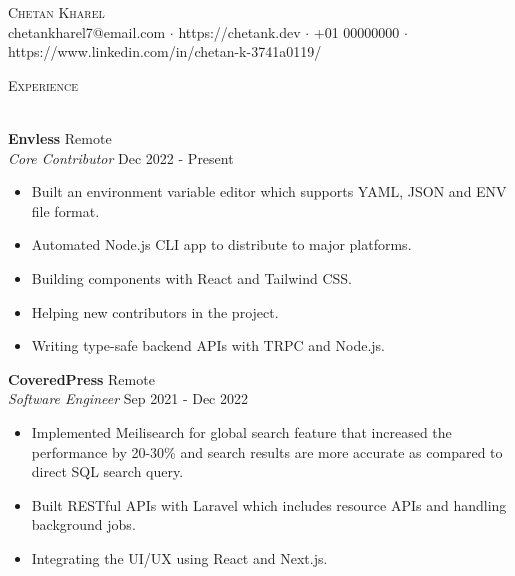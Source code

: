 \documentclass[a4paper]{article}
\newcommand{\lineunder} {
    \vspace*{-8pt} \\
    \hspace*{-18pt} \hrulefill \\
}
\newcommand{\header} [1] {
    {\hspace*{-18pt}\vspace*{6pt} \textsc{#1}}
    \vspace*{-6pt} \lineunder
}
\begin{document}
\vspace*{-40pt}

    

\vspace*{-10pt}
\begin{center}
	{\Huge \scshape {Chetan Kharel}}\\
	chetankharel7@email.com $\cdot$ https://chetank.dev $\cdot$ +01 00000000 $\cdot$ https://www.linkedin.com/in/chetan-k-3741a0119/\\
\end{center}


\header{Experience}
\vspace{1mm}

\textbf{Envless} \hfill Remote\\
\textit{Core Contributor} \hfill Dec 2022 - Present\\
\vspace{-1mm}
\begin{itemize} \itemsep 1pt
	\item Built an environment variable editor which supports YAML, JSON and ENV file format.
	\item Automated Node.js CLI app to distribute to major platforms.
	\item Building components with React and Tailwind CSS.
	\item Helping new contributors in the project.
	\item Writing type-safe backend APIs with TRPC and Node.js.
\end{itemize}

\textbf{CoveredPress} \hfill Remote\\
\textit{Software Engineer} \hfill Sep 2021 - Dec 2022\\
\vspace{-1mm}
\begin{itemize} \itemsep 1pt
	\item Implemented Meilisearch for global search feature that increased the performance by 20-30\% and search results are more accurate as compared to direct SQL search query.
	\item Built RESTful APIs with Laravel which includes resource APIs and handling background jobs.
	\item Integrating the UI/UX using React and Next.js.
\end{itemize}
\end{document}

